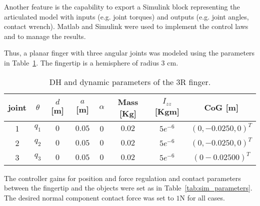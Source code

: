 Another feature is the capability to export a Simulink block representing the articulated model with inputs (e.g. joint torques) and outputs (e.g. joint angles, contact wrench). Matlab and Simulink were used to implement the control laws and to manage the results.

Thus, a planar finger with three angular joints was modeled using the parameters in Table~\ref{tab:3R}. The fingertip is a hemisphere of radius $3$ cm.

\begin{table}
\centering
\begin{tabular}{cccccccc}
    \toprule
    \textbf{joint} & $\theta$ & $d$ [m] & $a$ [m] & $\alpha$ & \textbf{Mass [Kg]} & $I_{zz}$ [Kgm] & \textbf{CoG [m]}\\
    \toprule
    1 & $q_1$ & $0$ & $0.05$ & 0 & $0.02$ & $5e^{-6}$ & $(0, -0.0250, 0)^{T}$\\
    \midrule
    2 & $q_2$ & $0$ & $0.05$ & $0$ & $0.02$ & $5e^{-6}$ & $(0, -0.0250, 0)^{T}$\\
    \midrule
    3 & $q_3$ & $0$ & $0.05$ & $0$ & $0.02$ & $5e^{-6}$ & $(0 -0.0250 0)^{T}$\\
    \bottomrule
\end{tabular}
\caption{DH and dynamic parameters of the 3R finger.}
\label{tab:3R}
\end{table}

The controller gains for position and force regulation and contact parameters between the fingertip and the objects were set as in Table~\ref{tab:sim_parameters}. The desired normal component contact force was set to $1$N for all cases.

\begin{figure}
\begin{floatrow}
\end{floatrow}
\end{figure}


